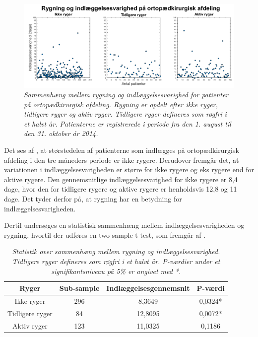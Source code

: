 \begin{figure}[H]
	\centering
	\includegraphics[scale=0.35]{figures/rygerogindlaeg}
	\caption{\textit{Sammenhæng mellem rygning og indlæggelsesvarighed for patienter på ortopædkirurgisk afdeling. Rygning er opdelt efter ikke ryger, tidligere ryger og aktiv ryger. Tidligere ryger defineres som røgfri i et halvt år. Patienterne er registrerede i periode fra den 1. august til den 31. oktober år 2014.}}
	\label{rygningogindlaeggelse}
\end{figure}


\noindent
Det ses af , at størstedelen af patienterne som indlægges på ortopædkirurgisk afdeling i den tre måneders periode er ikke rygere. Derudover fremgår det, at variationen i indlæggelsesvarigheden er større for ikke rygere og eks rygere end for aktive rygere. Den gennemsnitlige indlæggelsesvarighed for ikke rygere er 8,4 dage, hvor den for tidligere rygere og aktive rygere er henholdsvis 12,8 og 11 dage. Det tyder derfor på, at rygning har en betydning for indlæggelsesvarigheden. 

Dertil undersøges en statistisk sammenhæng mellem indlæggelsesvarigheden og rygning, hvortil der udføres en two sample t-test, som fremgår af .

\begin{table}[H]
\centering
\begin{tabular}{|c|c|c|c|}
\hline
\textbf{Ryger} & \textbf{Sub-sample} & \textbf{Indlæggelsesgennemsnit} & \textbf{P-værdi} \\ \hline
Ikke ryger        & 296                 & 8,3649                          & 0,0324*          \\ \hline
Tidligere ryger         & 84                  & 12,8095                         & 0,0072*          \\ \hline
Aktiv ryger             & 123                 & 11,0325                         & 0,1186           \\ \hline
\end{tabular}
\caption{\textit{Statistik over sammenhæng mellem rygning og indlæggelsesvarighed. Tidligere ryger defineres som røgfri i et halvt år. P-værdier under et signifikantsniveau på 5\% er angivet med *.}}
\label{rygerindlaegtab}
\end{table}

